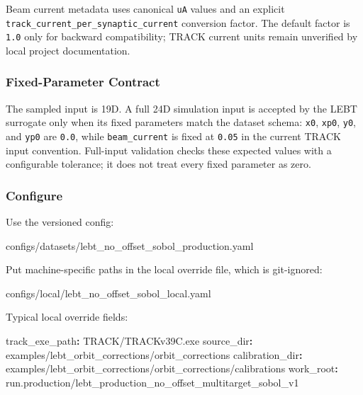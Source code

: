 \documentclass[
]{article}
\newenvironment{Shaded}{}{}
\newcommand{\AttributeTok}[1]{\textcolor[rgb]{0.49,0.56,0.16}{#1}}
\newcommand{\FunctionTok}[1]{\textcolor[rgb]{0.02,0.16,0.49}{#1}}
\newcommand{\KeywordTok}[1]{\textcolor[rgb]{0.00,0.44,0.13}{\textbf{#1}}}
\newcommand{\NormalTok}[1]{#1}
\begin{document}
Beam current metadata uses canonical \texttt{uA} values and an explicit
\texttt{track\_current\_per\_synaptic\_current} conversion factor. The
default factor is \texttt{1.0} only for backward compatibility; TRACK
current units remain unverified by local project documentation.

\hypertarget{fixed-parameter-contract}{%
\subsubsection{Fixed-Parameter
Contract}\label{fixed-parameter-contract}}

The sampled input is 19D. A full 24D simulation input is accepted by the
LEBT surrogate only when its fixed parameters match the dataset schema:
\texttt{x0}, \texttt{xp0}, \texttt{y0}, and \texttt{yp0} are
\texttt{0.0}, while \texttt{beam\_current} is fixed at \texttt{0.05} in
the current TRACK input convention. Full-input validation checks these
expected values with a configurable tolerance; it does not treat every
fixed parameter as zero.

\hypertarget{configure}{%
\subsubsection{Configure}\label{configure}}

Use the versioned config:

\begin{Shaded}
\begin{Highlighting}[]
\NormalTok{configs/datasets/lebt\_no\_offset\_sobol\_production.yaml}
\end{Highlighting}
\end{Shaded}

Put machine-specific paths in the local override file, which is
git-ignored:

\begin{Shaded}
\begin{Highlighting}[]
\NormalTok{configs/local/lebt\_no\_offset\_sobol\_local.yaml}
\end{Highlighting}
\end{Shaded}

Typical local override fields:

\begin{Shaded}
\begin{Highlighting}[]
\FunctionTok{track\_exe\_path}\KeywordTok{:}\AttributeTok{ TRACK/TRACKv39C.exe}
\FunctionTok{source\_dir}\KeywordTok{:}\AttributeTok{ examples/lebt\_orbit\_corrections/orbit\_corrections}
\FunctionTok{calibration\_dir}\KeywordTok{:}\AttributeTok{ examples/lebt\_orbit\_corrections/orbit\_corrections/calibrations}
\FunctionTok{work\_root}\KeywordTok{:}\AttributeTok{ run.production/lebt\_production\_no\_offset\_multitarget\_sobol\_v1}
\end{Highlighting}
\end{Shaded}
\end{document}
